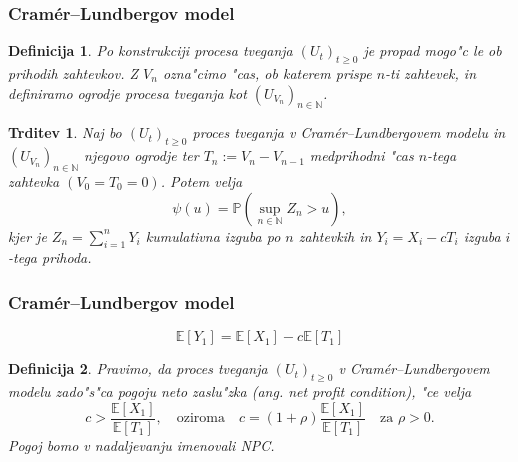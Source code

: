 \documentclass[handout]{beamer} %
\theoremstyle{plain}
\newtheorem{definicija}{Definicija}
\newtheorem{trditev}{Trditev}
\newcommand{\N}{\mathbb{N}}
\newcommand{\E}{\mathbb{E}}
\newcommand{\Prob}{\mathbb{P}}
\begin{document}
\begin{frame}
  \frametitle{Cramér--Lundbergov model}
  \begin{definicija}
    Po konstrukciji procesa tveganja $(U_t)_{t\geq0}$ je propad mogo"c le ob 
    prihodih zahtevkov. %
    Z $V_n$ ozna"cimo "cas, ob katerem prispe $n$-ti zahtevek, in definiramo 
    \textit{ogrodje procesa tveganja} kot $(U_{V_n})_{n\in\N}$.
    \label{def:ogrodjeProcesaTveganja}
  \end{definicija}
  \pause
  \begin{trditev}
    Naj bo $(U_t)_{t\geq0}$ proces tveganja v Cramér--Lundbergovem modelu in $(U_{V_n})_{n\in\N}$ 
    njegovo ogrodje ter $T_n := V_n - V_{n-1}$ medprihodni "cas $n$-tega zahtevka 
    $(V_0 = T_0 = 0)$. Potem velja 
    \begin{equation*}
        \psi(u) = \Prob\left(\sup_{n\in\N}Z_n > u\right),
    \end{equation*}
    kjer je $Z_n = \sum_{i=1}^nY_i$  kumulativna izguba po $n$ zahtevkih in $Y_i = X_i - cT_i$
    izguba $i$-tega prihoda.
    \label{trd:verjetnostPropadaZOgrodjem}
  \end{trditev}
\end{frame}

\begin{frame}
  \frametitle{Cramér--Lundbergov model}
  \begin{equation*}
    \E\left[Y_1\right] = \E\left[X_1\right] - c\E\left[T_1\right]
  \end{equation*}
  \begin{definicija}
    Pravimo, da proces tveganja $(U_t)_{t\geq0}$ v Cramér--Lundbergovem modelu
     zado"s"ca \textit{pogoju neto zaslu"zka} (ang. \textit{net profit condition}), "ce velja 
    \begin{equation*}
        c > \frac{\E\left[X_1\right]}{\E\left[T_1\right]}, \quad \text{oziroma} \quad 
        c = (1 + \rho)\frac{\E\left[X_1\right]}{\E\left[T_1\right]} \quad \text{za $\rho > 0$}.
    \end{equation*}
    Pogoj bomo v nadaljevanju imenovali NPC.
    \label{def:NPC}
  \end{definicija}
\end{frame}
\end{document}
